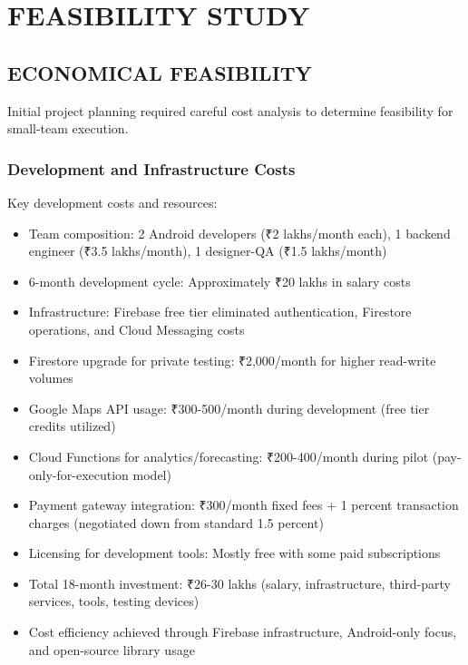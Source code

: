 \documentclass[12pt,a4paper]{report}
\begin{document}
\setcounter{chapter}{1}

\chapter{FEASIBILITY STUDY}

\justifying

\section{ECONOMICAL FEASIBILITY}

Initial project planning required careful cost analysis to determine feasibility for small-team execution.

\subsection{Development and Infrastructure Costs}

Key development costs and resources:

\begin{itemize}
  \item Team composition: 2 Android developers (₹2 lakhs/month each), 1 backend engineer (₹3.5 lakhs/month), 1 designer-QA (₹1.5 lakhs/month)
  \item 6-month development cycle: Approximately ₹20 lakhs in salary costs
  \item Infrastructure: Firebase free tier eliminated authentication, Firestore operations, and Cloud Messaging costs
  \item Firestore upgrade for private testing: ₹2,000/month for higher read-write volumes
  \item Google Maps API usage: ₹300-500/month during development (free tier credits utilized)
  \item Cloud Functions for analytics/forecasting: ₹200-400/month during pilot (pay-only-for-execution model)
  \item Payment gateway integration: ₹300/month fixed fees + 1 percent transaction charges (negotiated down from standard 1.5 percent)
  \item Licensing for development tools: Mostly free with some paid subscriptions
  \item Total 18-month investment: ₹26-30 lakhs (salary, infrastructure, third-party services, tools, testing devices)
  \item Cost efficiency achieved through Firebase infrastructure, Android-only focus, and open-source library usage
\end{itemize}
\end{document}
